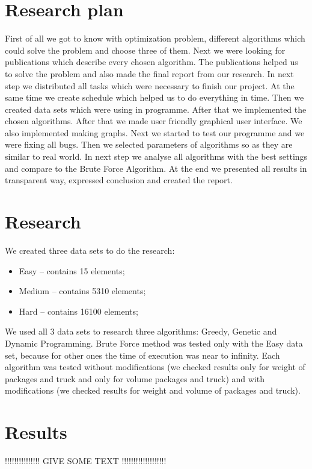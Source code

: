 \documentclass[conference,compsoc]{IEEEtran}
\begin{document}
\section{Research plan}
First of all we got to know with optimization problem, different algorithms which could solve the problem and choose three of them. Next we were looking for publications which describe every chosen algorithm. The publications helped us to solve the problem and also made the final report from our research. In next step we distributed all tasks which were necessary to finish our project. At the same time we create schedule which helped us to do everything in time. Then we created data sets which were using in programme. After that we implemented the chosen algorithms. After that we made user friendly graphical user interface. We also implemented making graphs. Next we started to test our programme and we were fixing all bugs. Then we selected parameters of algorithms so as they are similar to real world. In next step we analyse all algorithms with the best settings and compare to the Brute Force Algorithm. At the end we presented all results in transparent way, expressed conclusion and created the report.

\section{Research}
We created three data sets to do the research:
\begin{itemize}
\item Easy – contains 15 elements;
\item Medium – contains 5310 elements;
\item Hard – contains 16100 elements;
\end{itemize}
We used all 3 data sets to research three algorithms: Greedy, Genetic and Dynamic Programming.
Brute Force method was tested only with the Easy data set, because for other ones the time of execution was near to infinity.
Each algorithm was tested without modifications (we checked results only for weight of packages and truck and only for volume packages and truck) and with modifications (we checked results for weight and volume of packages and truck).

\newpage
\section{Results}

!!!!!!!!!!!!!!! GIVE SOME TEXT    !!!!!!!!!!!!!!!!!!!
\end{document}
